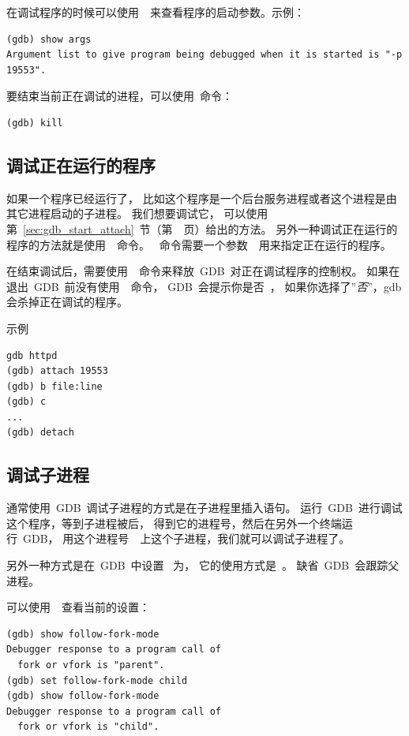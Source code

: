 在调试程序的时候可以使用~~来查看程序的启动参数。示例：
\begin{lstlisting}
(gdb) show args
Argument list to give program being debugged when it is started is "-p 19553".
\end{lstlisting}

要结束当前正在调试的进程，可以使用~命令：
\begin{lstlisting}
(gdb) kill
\end{lstlisting}

\subsection{调试正在运行的程序}
如果一个程序已经运行了，
比如这个程序是一个后台服务进程或者这个进程是由其它进程启动的子进程。
我们想要调试它，
可以使用第~\ref{sec:gdb_start_attach}~节（第~\pageref{sec:gdb_start_attach}~页）给出的方法。
另外一种调试正在运行的程序的方法就是使用~~命令。
~命令需要一个参数~~用来指定正在运行的程序。

在结束调试后，需要使用~~命令来释放~GDB~对正在调试程序的控制权。
如果在退出~GDB~前没有使用~~命令，
GDB~会提示你是否~，
如果你选择了''\emph{否}''，gdb会杀掉正在调试的程序。

示例
\begin{lstlisting}
gdb httpd
(gdb) attach 19553
(gdb) b file:line
(gdb) c
...
(gdb) detach
\end{lstlisting}

\subsection{调试子进程} 

通常使用~GDB~调试子进程的方式是在子进程里插入语句。
运行~GDB~进行调试这个程序，等到子进程被后，
得到它的进程号，然后在另外一个终端运行~GDB，
用这个进程号~~上这个子进程，我们就可以调试子进程了。

另外一种方式是在~GDB~中设置~
为，
它的使用方式是~。
缺省~GDB~会跟踪父进程。

可以使用~~查看当前的设置：
\begin{lstlisting}
(gdb) show follow-fork-mode
Debugger response to a program call of
  fork or vfork is "parent".
(gdb) set follow-fork-mode child
(gdb) show follow-fork-mode
Debugger response to a program call of
  fork or vfork is "child".
\end{lstlisting}

